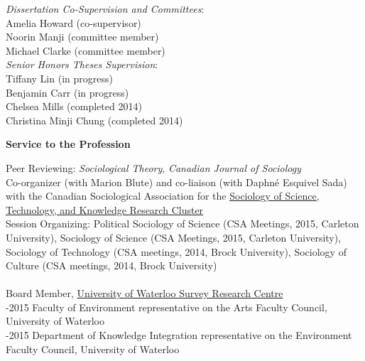 \documentclass[9pt,usenames,dvipsnames]{article}
\begin{document}
\noindent \emph{Dissertation Co-Supervision and Committees}:  \\
\noindent Amelia Howard (co-supervisor) \\
\noindent Noorin Manji (committee member) \\
\noindent Michael Clarke (committee member) \\

\noindent \emph{Senior Honors Theses Supervision}: \\
\noindent Tiffany Lin (in progress) \\
\noindent Benjamin Carr (in progress) \\ 
\noindent Chelsea Mills (completed 2014) \\ 
\noindent Christina Minji Chung (completed 2014) \\


\ind \textbf{Service to the Profession}

\noindent Peer Reviewing: {\it Sociological Theory}, {\it Canadian Journal of Sociology}\\

\noindent Co-organizer (with Marion Blute) and co-liaison (with Daphné Esquivel Sada) with the Canadian Sociological Association for the \href{http://www.csa-scs.ca/files/webapps/csapress/sstk/}{Sociology of Science, Technology, and Knowledge Research Cluster}\\

\noindent Session Organizing: Political Sociology of Science (CSA Meetings, 2015, Carleton University), Sociology of Science (CSA Meetings, 2015, Carleton University), Sociology of Technology (CSA meetings, 2014, Brock University), Sociology of Culture (CSA meetings, 2014, Brock University) \\

 \\
 Board Member, \href{http://math.uwaterloo.ca/survey-research-centre/node/1}{University of Waterloo Survey Research Centre}  \\

-2015 Faculty of Environment representative on the Arts Faculty Council, University of Waterloo \\

-2015 Department of Knowledge Integration representative on the Environment Faculty Council, University of Waterloo \\
\end{document}

